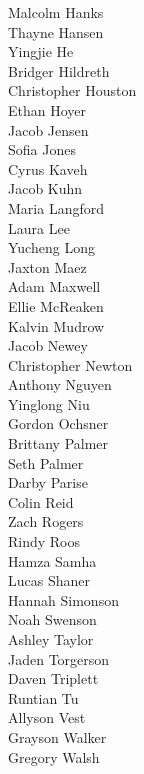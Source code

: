 \begin{multicols}{5}
{Malcolm Hanks\\
Thayne Hansen\\
Yingjie He\\
Bridger Hildreth\\
Christopher Houston\\
Ethan Hoyer\\
Jacob Jensen\\
Sofia Jones\\
Cyrus Kaveh\\
Jacob Kuhn\\
Maria Langford\\
Laura Lee\\
Yucheng Long\\
Jaxton Maez\\
Adam Maxwell\\
Ellie McReaken\\
Kalvin Mudrow\\
Jacob Newey\\
Christopher Newton\\
Anthony Nguyen\\
Yinglong Niu\\
Gordon Ochsner\\
Brittany Palmer\\
Seth Palmer\\
Darby Parise\\
Colin Reid\\
Zach Rogers\\
Rindy Roos\\
Hamza Samha\\
Lucas Shaner\\
Hannah Simonson\\
Noah Swenson\\
Ashley Taylor\\
Jaden Torgerson\\
Daven Triplett\\
Runtian Tu\\
Allyson Vest\\
Grayson Walker\\
Gregory Walsh\\
}
\end{multicols}
